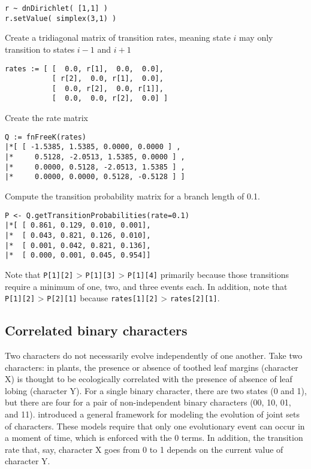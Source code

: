 {\tt \begin{snugshade*}
\begin{lstlisting}
r ~ dnDirichlet( [1,1] )
r.setValue( simplex(3,1) )
\end{lstlisting}
\end{snugshade*}}

Create a tridiagonal matrix of transition rates, meaning state $i$ may only transition to states $i-1$ and $i+1$

{\tt \begin{snugshade*}
\begin{lstlisting}
rates := [ [  0.0, r[1],  0.0,  0.0],
           [ r[2],  0.0, r[1],  0.0],
           [  0.0, r[2],  0.0, r[1]],
           [  0.0,  0.0, r[2],  0.0] ]
\end{lstlisting}
\end{snugshade*}}

Create the rate matrix

{\tt \begin{snugshade*}
\begin{lstlisting}
Q := fnFreeK(rates)
|*[ [ -1.5385, 1.5385, 0.0000, 0.0000 ] ,
|*     0.5128, -2.0513, 1.5385, 0.0000 ] ,
|*     0.0000, 0.5128, -2.0513, 1.5385 ] ,
|*     0.0000, 0.0000, 0.5128, -0.5128 ] ]
\end{lstlisting}
\end{snugshade*}}

Compute the transition probability matrix for a branch length of 0.1.

{\tt \begin{snugshade*}
\begin{lstlisting}
P <- Q.getTransitionProbabilities(rate=0.1)
|*[ [ 0.861, 0.129, 0.010, 0.001],
|*  [ 0.043, 0.821, 0.126, 0.010],
|*  [ 0.001, 0.042, 0.821, 0.136],
|*  [ 0.000, 0.001, 0.045, 0.954]]
\end{lstlisting}
\end{snugshade*}}

Note that {\tt P[1][2]} > {\tt P[1][3]} > {\tt P[1][4]} primarily because those transitions require a minimum of one, two, and three events each.
In addition, note that {\tt P[1][2]} > {\tt P[2][1]} because {\tt rates[1][2]} > {\tt rates[2][1]}.


\subsection{Correlated binary characters}

Two characters do not necessarily evolve independently of one another.
Take two characters: in plants, the presence or absence of toothed leaf margins (character X) is thought to be ecologically correlated with the presence of absence of leaf lobing (character Y).
For a single binary character, there are two states (0 and 1), but there are four for a pair of non-independent binary characters (00, 10, 01, and 11).
\citet{pagel04} introduced a general framework for modeling the evolution of joint sets of characters.
These models require that only one evolutionary event can occur in a moment of time, which is enforced with the 0 terms.
In addition, the transition rate that, say, character X goes from 0 to 1 depends on the current value of character Y.

